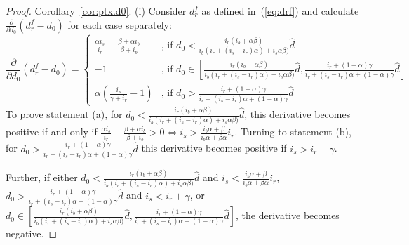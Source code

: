 \documentclass[a4paper,11pt]{article}
\newcommand{\dref}{\widehat d}
\renewcommand{\~}[1]{\tilde{#1}}
\renewcommand{\-}[1]{\overline{#1}}
\begin{document}
\begin{appendices}
\begin{proof}{Corollary~\ref{cor:ptx.d0}.}
(i) Consider $d_r^f$ as defined in~(\ref{eq:drf}) and calculate $\frac{\partial}{\partial d_0}\left(d_r^f-d_0\right)$ for each case separately:
    \begin{equation}\label{eq:d.ext}
        \frac{\partial}{\partial d_0}\left(d_r^f-d_0\right)= \begin{cases}
        \frac{\alpha  i_s}{i_r}-\frac{\beta +\alpha  i_b}{\beta +i_b}
  & \text{, if } d_0 < \frac{ i_r (i_b + \alpha \beta)}{
  i_b (i_r + \left(i_s- i_r\right) \alpha) + i_s \alpha \beta)}\dref\\
  -1 & \text{, if }d_0\in\left[\frac{ i_r (i_b + \alpha \beta)}{
  i_b (i_r + \left(i_s- i_r\right) \alpha) + i_s \alpha \beta)}\dref,\frac{ i_r + \left(1- \alpha\right) \gamma}{i_r + (i_s-i_r) \alpha + (1-\alpha)\gamma}\dref\right]\\
  \alpha  \left(\frac{i_s}{\gamma +i_r}-1\right)& \text{, if } d_0 >\frac{ i_r + \left(1- \alpha\right) \gamma}{i_r + (i_s-i_r) \alpha + (1-\alpha)\gamma}\dref
        \end{cases}
    \end{equation}
To prove statement (a), for $d_0 < \frac{ i_r (i_b + \alpha \beta)}{
  i_b (i_r + \left(i_s- i_r\right) \alpha) + i_s \alpha \beta)}\dref$, this derivative becomes positive if and only if $\frac{\alpha  i_s}{i_r}-\frac{\beta +\alpha  i_b}{\beta +i_b}>0\Leftrightarrow i_s  >\frac{i_b \alpha + \beta}{i_b\alpha + \beta\alpha}i_r$. Turning to statement (b), for $d_0 >\frac{ i_r + \left(1- \alpha\right) \gamma}{i_r + (i_s-i_r) \alpha + (1-\alpha)\gamma}\dref$  this derivative becomes positive if $ i_s>i_r + \gamma$.
  
  Further, if either $d_0 < \frac{ i_r (i_b + \alpha \beta)}{
  i_b (i_r + \left(i_s- i_r\right) \alpha) + i_s \alpha \beta)}\dref$ and $i_s  <\frac{i_b \alpha + \beta}{i_b\alpha + \beta\alpha}i_r$,
  $d_0 >\frac{ i_r + \left(1- \alpha\right) \gamma}{i_r + (i_s-i_r) \alpha + (1-\alpha)\gamma}\dref$ and $ i_s<i_r + \gamma$, or 
 $ d_0\in\left[\frac{ i_r (i_b + \alpha \beta)}{
  i_b (i_r + \left(i_s- i_r\right) \alpha) + i_s \alpha \beta)}\dref,\frac{ i_r + \left(1- \alpha\right) \gamma}{i_r + (i_s-i_r) \alpha + (1-\alpha)\gamma}\dref\right]$, the derivative becomes negative.



\end{proof}
\end{appendices}
\end{document}
